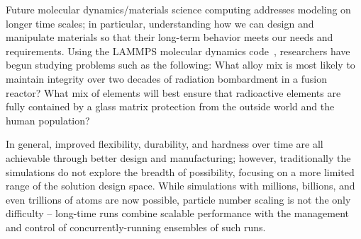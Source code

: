

Future molecular dynamics/materials science computing addresses
modeling on longer time scales; in particular, understanding
how we can design and manipulate materials so that their
long-term behavior meets our needs and requirements. 
Using the LAMMPS molecular dynamics code~\cite{LAMMPS},
researchers have begun studying problems such as the following:
What alloy mix is most likely to maintain integrity over two 
decades of radiation bombardment in a fusion reactor?
What mix of elements will best ensure that
radioactive elements are fully contained by a glass matrix 
protection from the outside world and the human population?

In general, improved flexibility, durability, and hardness 
over time are all achievable through better design and
manufacturing; however, traditionally the simulations do not
explore the breadth of possibility, focusing on a more limited 
range of the solution design space.
While simulations with millions, billions, and even trillions
of atoms are now possible, particle number scaling is
not the only difficulty --
long-time runs combine scalable performance with the management and control of concurrently-running ensembles of such runs. 


